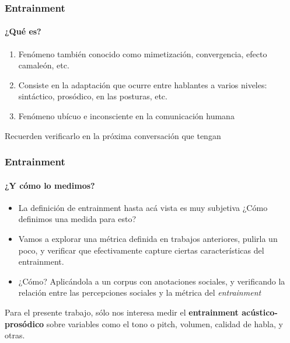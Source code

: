 \begin{frame}
  \frametitle{Entrainment}
  \framesubtitle{¿Qué es?}
  \begin{enumerate}
    \item Fenómeno también conocido como mimetización, convergencia, efecto camaleón, etc.
    \item Consiste en la adaptación que ocurre entre hablantes a varios niveles: sintáctico, prosódico, en las posturas, etc.
    \item Fenómeno ubícuo e inconsciente en la comunicación humana
  \end{enumerate}

  Recuerden verificarlo en la próxima conversación que tengan
\end{frame}

\begin{frame}
  \frametitle{Entrainment}
  \framesubtitle{¿Y cómo lo medimos?}

  \begin{itemize}
    \item La definición de entrainment hasta acá vista es muy subjetiva ¿Cómo definimos una medida para esto?
    \item Vamos a explorar una métrica definida en trabajos anteriores, pulirla un poco, y verificar que efectivamente capture ciertas características del entrainment.
    \item ¿Cómo? Aplicándola a un corpus con anotaciones sociales, y verificando la relación entre las percepciones sociales y la métrica del \emph{entrainment}
  \end{itemize}


  Para el presente trabajo, sólo nos interesa medir el \textbf{entrainment acústico-prosódico} sobre variables como el tono o pitch, volumen, calidad de habla, y otras.
\end{frame}
